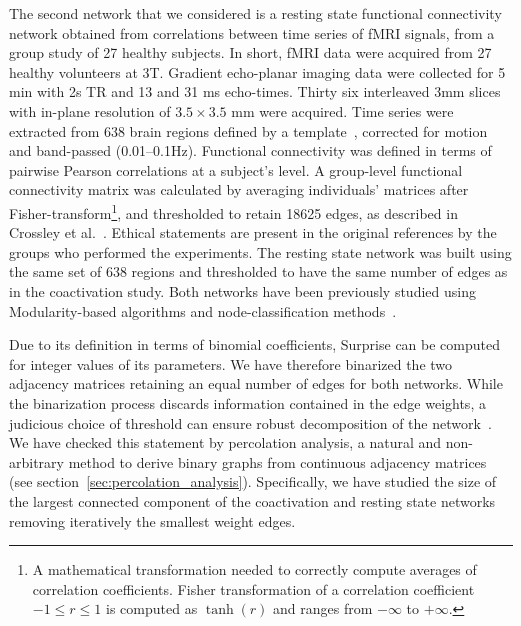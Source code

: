 The second network that we considered is a resting state functional connectivity network obtained from correlations between time series of fMRI signals, from a group study of 27 healthy subjects. In short, fMRI data were acquired from 27 healthy volunteers at 3T. Gradient echo-planar imaging data were collected for 5 min with 2s TR and 13 and 31 ms echo-times. Thirty six interleaved 3mm slices with in-plane resolution of $3.5\times 3.5$ mm were acquired. 
Time series were extracted from 638 brain regions defined by a template~\cite{crossley2013a}, corrected for motion and band-passed (0.01–0.1Hz).
Functional connectivity was defined in terms of pairwise Pearson correlations at a subject's level.
A group-level functional connectivity matrix was calculated by averaging individuals' matrices after Fisher-transform\footnote{A mathematical transformation needed to correctly compute averages of correlation coefficients. Fisher transformation of a correlation coefficient $-1 \leq r \leq 1$ is computed as $\tanh(r)$ and ranges from $-\infty$ to $+\infty$.}, and thresholded to retain 18625 edges, as described in Crossley et al.~\cite{crossley2013a}.
Ethical statements are present in the original references by the groups who performed the experiments. 
The resting state network was built using the same set of 638 regions and thresholded to have the same number of edges as in the coactivation study.
Both networks have been previously studied using Modularity-based algorithms and node-classification methods~\cite{crossley2013a}.

Due to its definition in terms of binomial coefficients, Surprise can be computed for integer values of its parameters.
We have therefore binarized the two adjacency matrices retaining an equal number of edges for both networks.
While the binarization process discards information contained in the edge weights, a judicious choice of threshold can ensure robust decomposition of the network~\cite{meunier2010,he2009}.
We have checked this statement by percolation analysis, a natural and non-arbitrary method to derive binary graphs from continuous adjacency matrices (see section~\ref{sec:percolation_analysis}).
Specifically, we have studied the size of the largest connected component of the coactivation and resting state networks removing iteratively the smallest weight edges.

